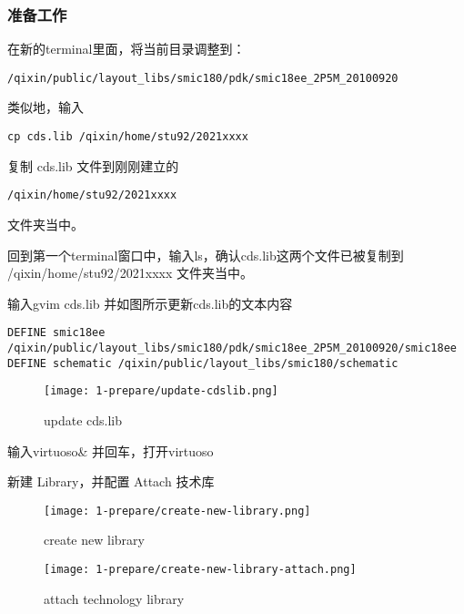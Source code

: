\documentclass{theme-2614084}
\begin{document}
\subsubsection{准备工作}

在新的terminal里面，将当前目录调整到：

\begin{verbatim}
/qixin/public/layout_libs/smic180/pdk/smic18ee_2P5M_20100920
\end{verbatim}

类似地，输入 

\begin{verbatim}
cp cds.lib /qixin/home/stu92/2021xxxx
\end{verbatim}

复制 cds.lib 文件到刚刚建立的 

\begin{verbatim}
/qixin/home/stu92/2021xxxx
\end{verbatim}

文件夹当中。

回到第一个terminal窗口中，输入ls，确认cds.lib这两个文件已被复制到 /qixin/home/stu92/2021xxxx 文件夹当中。

输入gvim cds.lib 并如图所示更新cds.lib的文本内容

\begin{verbatim}
DEFINE smic18ee /qixin/public/layout_libs/smic180/pdk/smic18ee_2P5M_20100920/smic18ee
DEFINE schematic /qixin/public/layout_libs/smic180/schematic
\end{verbatim}

\begin{figure}[H]
  \centering
  \texttt{[image: 1-prepare/update-cdslib.png]}
  \caption{update cds.lib}
\end{figure}

输入virtuoso\& 并回车，打开virtuoso

新建 Library，并配置 Attach 技术库

\begin{figure}[htbp]
  \centering\begin{minipage}[t]{0.48\textwidth}
      \centering\texttt{[image: 1-prepare/create-new-library.png]}
      \caption{create new library}
  \end{minipage}
  \centering\begin{minipage}[t]{0.48\textwidth}
      \centering\texttt{[image: 1-prepare/create-new-library-attach.png]}
      \caption{attach technology library}
  \end{minipage}
\end{figure}
\end{document}
